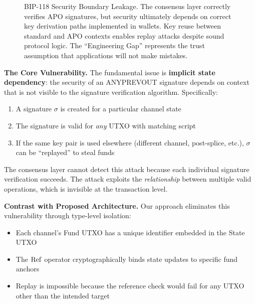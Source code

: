 \begin{figure}[htbp]
\caption{BIP-118 Security Boundary Leakage. The consensus layer correctly verifies APO signatures, but security ultimately depends on correct key derivation paths implemented in wallets. Key reuse between standard and APO contexts enables replay attacks despite sound protocol logic. The ``Engineering Gap'' represents the trust assumption that applications will not make mistakes.}
\label{fig:bip118}
\end{figure}

\textbf{The Core Vulnerability.} The fundamental issue is \textbf{implicit state dependency}: the security of an ANYPREVOUT signature depends on context that is not visible to the signature verification algorithm. Specifically:
\begin{enumerate}
    \item A signature $\sigma$ is created for a particular channel state
    \item The signature is valid for \textit{any} UTXO with matching script
    \item If the same key pair is used elsewhere (different channel, post-splice, etc.), $\sigma$ can be ``replayed'' to steal funds
\end{enumerate}

The consensus layer cannot detect this attack because each individual signature verification succeeds. The attack exploits the \textit{relationship} between multiple valid operations, which is invisible at the transaction level.

\textbf{Contrast with Proposed Architecture.} Our approach eliminates this vulnerability through type-level isolation:
\begin{itemize}
    \item Each channel's Fund UTXO has a unique identifier embedded in the State UTXO
    \item The $\operatorname{Ref}$ operator cryptographically binds state updates to specific fund anchors
    \item Replay is impossible because the reference check would fail for any UTXO other than the intended target
\end{itemize}

